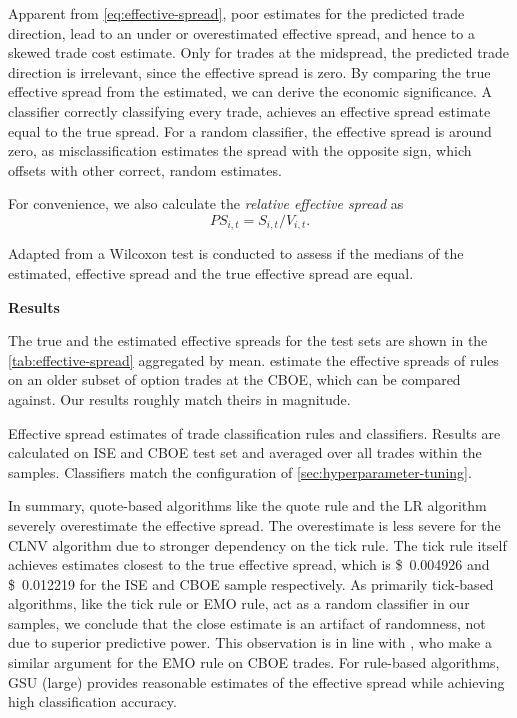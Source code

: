 Apparent from \cref{eq:effective-spread}, poor estimates for the predicted trade direction, lead to an under or overestimated effective spread, and hence to a skewed trade cost estimate. Only for trades at the midspread, the predicted trade direction is irrelevant, since the effective spread is zero. By comparing the true effective spread from the estimated, we can derive the economic significance. A classifier correctly classifying every trade, achieves an effective spread estimate equal to the true spread. For a random classifier, the effective spread is around zero, as misclassification estimates the spread with the opposite sign, which offsets with other correct, random estimates.

For convenience, we also calculate the \emph{relative effective spread} as
\begin{equation}
    {PS}_{i,t} = S_{i,t} / V_{i,t}.
\end{equation}

Adapted from \textcite[][158]{theissenTestAccuracyLee2001} a Wilcoxon test is conducted to assess if the medians of the estimated, effective spread and the true effective spread are equal.

\textbf{Results}

The true and the estimated effective spreads for the test sets are shown in the \cref{tab:effective-spread} aggregated by mean. \textcite[][896--897]{savickasInferringDirectionOption2003} estimate the effective spreads of rules on an older subset of option trades at the \gls{CBOE}, which can be compared against. Our results roughly match theirs in magnitude.

\begin{table}[!ht]
    \centering
    
    \caption[Effective Spread Estimates]{Effective spread estimates of trade classification rules and classifiers. Results are calculated on \gls{ISE} and \gls{CBOE} test set and averaged over all trades within the samples. Classifiers match the configuration of \cref{sec:hyperparameter-tuning}.}
    \label{tab:effective-spread}
\end{table}

In summary, quote-based algorithms like the quote rule and the \gls{LR} algorithm severely overestimate the effective spread. The overestimate is less severe for the \gls{CLNV} algorithm due to stronger dependency on the tick rule. The tick rule itself achieves estimates closest to the true effective spread, which is \SI[round-mode=places, round-precision=3]{0.004926}[\$]{} and \SI[round-mode=places, round-precision=3]{0.012219}[\$]{} for the \gls{ISE} and \gls{CBOE} sample respectively. As primarily tick-based algorithms, like the tick rule or \gls{EMO} rule, act as a random classifier in our samples, we conclude that the close estimate is an artifact of randomness, not due to superior predictive power. This observation is in line with \textcite[][897]{savickasInferringDirectionOption2003}, who make a similar argument for the \gls{EMO} rule on \gls{CBOE} trades. For rule-based algorithms, \gls{GSU} (large) provides reasonable estimates of the effective spread while achieving high classification accuracy.

